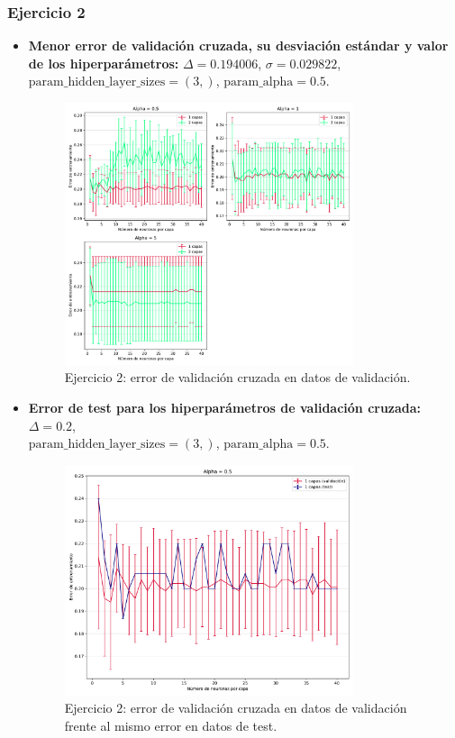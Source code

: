 \documentclass[11pt]{article}
\begin{document}
\subsubsection*{Ejercicio 2}

\begin{itemize}
    \item \textbf{Menor error de validación cruzada, su desviación estándar y valor de los hiperparámetros:} $\Delta = 0.194006$, $\sigma = 0.029822$, $\text{param\_hidden\_layer\_sizes} = (3,)$, $\text{param\_alpha} = 0.5$.
    \begin{figure}[h]
    \centering
    \includegraphics[width=0.8\textwidth]{fotos/ej2_1.pdf}
    \caption{Ejercicio 2: error de validación cruzada en datos de validación.}
    \end{figure}
    \item \textbf{Error de test para los hiperparámetros de validación cruzada:} $\Delta = 0.2$, \\ $\text{param\_hidden\_layer\_sizes} = (3,)$, $\text{param\_alpha} = 0.5$.
    \begin{figure}[h]
    \centering
    \includegraphics[width=0.8\textwidth]{fotos/ej2_2.pdf}
    \caption{Ejercicio 2: error de validación cruzada en datos de validación frente al mismo error en datos de test.}
    \end{figure}
\end{itemize}
\end{document}
